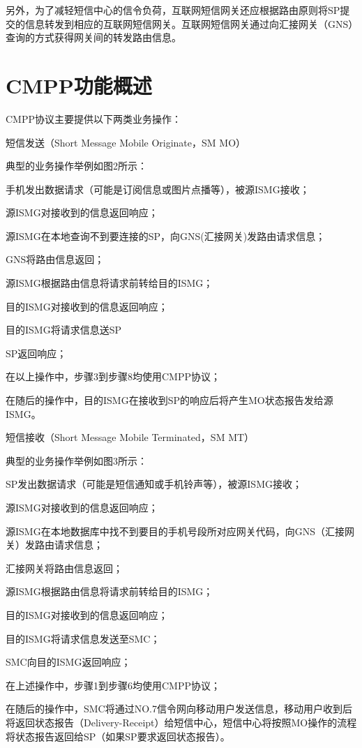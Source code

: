 \documentclass[11pt]{book} %
\begin{document}
另外，为了减轻短信中心的信令负荷，互联网短信网关还应根据路由原则将SP提交的信息转发到相应的互联网短信网关。互联网短信网关通过向汇接网关（GNS）查询的方式获得网关间的转发路由信息。


\chapter{CMPP功能概述}

CMPP协议主要提供以下两类业务操作：

\begin{compactenum}
\item 短信发送（Short Message Mobile Originate，SM MO）

典型的业务操作举例如图2所示：

\begin{compactenum}[1)]
\item 手机发出数据请求（可能是订阅信息或图片点播等），被源ISMG接收；
\item 源ISMG对接收到的信息返回响应；
\item 源ISMG在本地查询不到要连接的SP，向GNS(汇接网关)发路由请求信息；
\item GNS将路由信息返回；
\item 源ISMG根据路由信息将请求前转给目的ISMG；
\item 目的ISMG对接收到的信息返回响应；
\item 目的ISMG将请求信息送SP
\item SP返回响应；
\end{compactenum}

在以上操作中，步骤3到步骤8均使用CMPP协议；

在随后的操作中，目的ISMG在接收到SP的响应后将产生MO状态报告发给源ISMG。


\item 短信接收（Short Message Mobile Terminated，SM MT）

典型的业务操作举例如图3所示：

\begin{compactenum}[1)]
\item SP发出数据请求（可能是短信通知或手机铃声等），被源ISMG接收；
\item 源ISMG对接收到的信息返回响应；
\item 源ISMG在本地数据库中找不到要目的手机号段所对应网关代码，向GNS（汇接网关）发路由请求信息；
\item 汇接网关将路由信息返回；
\item 源ISMG根据路由信息将请求前转给目的ISMG；
\item 目的ISMG对接收到的信息返回响应；
\item 目的ISMG将请求信息发送至SMC；
\item SMC向目的ISMG返回响应；
\end{compactenum}

在上述操作中，步骤1到步骤6均使用CMPP协议；

在随后的操作中，SMC将通过NO.7信令网向移动用户发送信息，移动用户收到后将返回状态报告（Delivery-Receipt）给短信中心，短信中心将按照MO操作的流程将状态报告返回给SP（如果SP要求返回状态报告）。

\end{compactenum}
\end{document}
